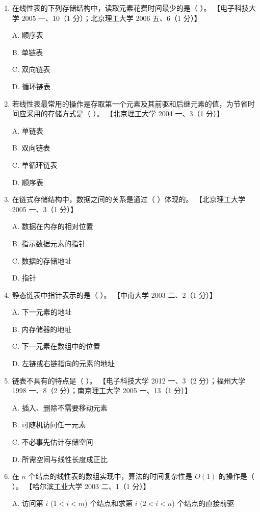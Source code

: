 \documentclass[lang=cn,newtx,10pt,scheme=chinese]{../../elegantbook}
\begin{document}
\begin{enumerate}
    \item 在线性表的下列存储结构中，读取元素花费时间最少的是（ ）。  
    【电子科技大学 2005 一、10（1 分）；北京理工大学 2006 五、6（1 分）】  

    A. 顺序表  

    B. 单链表  

    C. 双向链表  

    D. 循环链表  

    \item 若线性表最常用的操作是存取第一个元素及其前驱和后继元素的值，为节省时间应采用的存储方式是（ ）。  
    【北京理工大学 2004 一、3（1 分）】  

    A. 单链表  

    B. 双向链表  

    C. 单循环链表  

    D. 顺序表  

    \item 在链式存储结构中，数据之间的关系是通过（ ）体现的。  
    【北京理工大学 2005 一、3（1 分）】  

    A. 数据在内存的相对位置  

    B. 指示数据元素的指针  

    C. 数据的存储地址  

    D. 指针  

    \item 静态链表中指针表示的是（ ）。  
    【中南大学 2003 二、2（1 分）】  

    A. 下一元素的地址  

    B. 内存储器的地址 

    C. 下一元素在数组中的位置  

    D. 左链或右链指向的元素的地址  

    \item 链表不具有的特点是（ ）。  
    【电子科技大学 2012 一、3（2 分）；福州大学 1998 一、8（2 分）；南京理工大学 2005 一、13（1 分）】 

    A. 插入、删除不需要移动元素

    B. 可随机访问任一元素  

    C. 不必事先估计存储空间  

    D. 所需空间与线性长度成正比  

    \item 在 $n$ 个结点的线性表的数组实现中，算法的时间复杂性是 $O(1)$ 的操作是（ ）。  
    【哈尔滨工业大学 2003 二、1（1 分）】  

    A. 访问第 $i$ ($1 < i < m$) 个结点和求第 $i$ ($2 < i < n$) 个结点的直接前驱  


\end{enumerate}
\end{document}
